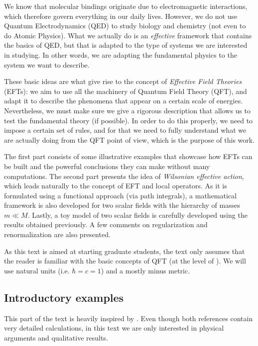 \documentclass[11pt]{article}
\begin{document}
We know that molecular bindings originate due to electromagnetic interactions, which therefore govern everything in our daily lives. However, we do not use Quantum Electrodynamics (QED) to study biology and chemistry (not even to do Atomic Physics). What we actually do is an \textit{effective} framework that contains the basics of QED, but that is adapted to the type of systems we are interested in studying. In other words, we are adapting the fundamental physics to the system we want to describe.

These basic ideas are what give rise to the concept of \textit{Effective Field Theories} (EFTs): we aim to use all the machinery of Quantum Field Theory (QFT), and adapt it to describe the phenomena that appear on a certain scale of energies. Nevertheless, we must make sure we give a rigorous description that allows us to test the fundamental theory (if possible). In order to do this properly, we need to impose a certain set of rules, and for that we need to fully understand what we are actually doing from the QFT point of view, which is the purpose of this work.

The first part consists of some illustrative examples that showcase how EFTs can be built and the powerful conclusions they can make without many computations. The second part presents the idea of \textit{Wilsonian effective action}, which leads naturally to the concept of EFT and local operators. As it is formulated using a functional approach (via path integrals), a mathematical framework is also developed for two scalar fields with the hierarchy of masses $m\ll M$. Lastly, a toy model of two scalar fields is carefully developed using the results obtained previously. A few comments on regularization and renormalization are also presented.

As this text is aimed at starting graduate students, the text only assumes that the reader is familiar with the basic concepts of QFT (at the level of \cite{tong}). We will use natural units (i.e. $\hbar=c=1$) and a mostly minus metric.
\subsection{Introductory examples}
This part of the text is heavily inspired by \cite{pich1998effectivefieldtheory,manohar2018introductioneffectivefieldtheories}. Even though both references contain very detailed calculations, in this text we are only interested in physical arguments and qualitative results.
\end{document}
